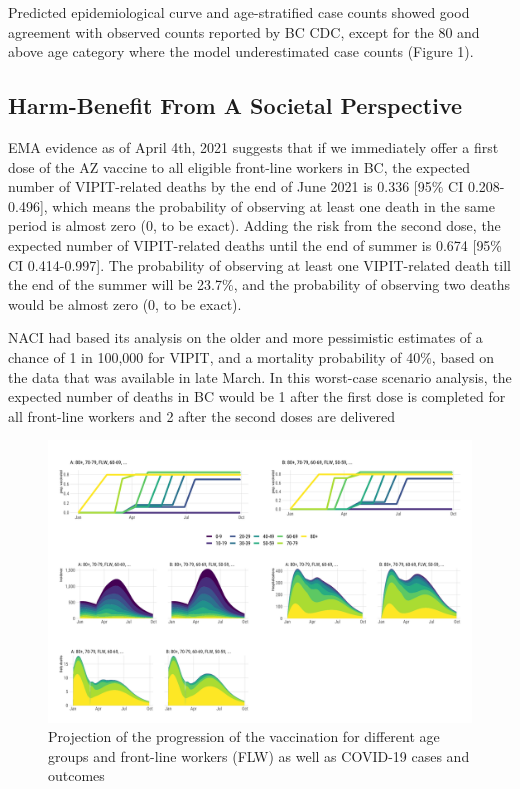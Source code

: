\documentclass[]{interact}
\theoremstyle{plain}%
\theoremstyle{definition}
\theoremstyle{remark}
\begin{document}
Predicted epidemiological curve and age-stratified case counts showed
good agreement with observed counts reported by BC CDC, except for the
80 and above age category where the model underestimated case counts
(Figure 1).

\hypertarget{harm-benefit-from-a-societal-perspective}{%
\subsection{Harm-Benefit From A Societal
Perspective}\label{harm-benefit-from-a-societal-perspective}}

EMA evidence as of April 4th, 2021 suggests that if we immediately offer
a first dose of the AZ vaccine to all eligible front-line workers in BC,
the expected number of VIPIT-related deaths by the end of June 2021 is
0.336 {[}95\% CI 0.208-0.496{]}, which means the probability of
observing at least one death in the same period is almost zero (0, to be
exact). Adding the risk from the second dose, the expected number of
VIPIT-related deaths until the end of summer is 0.674 {[}95\% CI
0.414-0.997{]}. The probability of observing at least one VIPIT-related
death till the end of the summer will be 23.7\%, and the probability of
observing two deaths would be almost zero (0, to be exact).

NACI had based its analysis on the older and more pessimistic estimates
of a chance of 1 in 100,000 for VIPIT, and a mortality probability of
40\%, based on the data that was available in late March. In this
worst-case scenario analysis, the expected number of deaths in BC would
be 1 after the first dose is completed for all front-line workers and 2
after the second doses are delivered

\begin{figure}

{\centering \includegraphics[width=1\linewidth]{../figures/fig-trajectoriesFull} 

}

\caption{Projection of the progression of the vaccination for different age groups and front-line workers (FLW) as well as COVID-19 cases and outcomes}\label{fig:fig1}
\end{figure}
\end{document}

